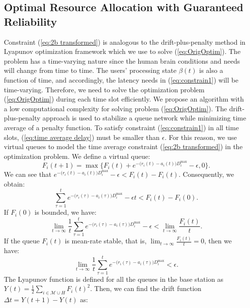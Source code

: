 \documentclass[journal,draftclsnofoot,onecolumn,12pt]{IEEEtran}%
\begin{document}
	\subsection{Optimal Resource Allocation with Guaranteed Reliability}
Constraint (\ref{eq:2b transformed}) is analogous to the drift-plus-penalty method in  Lyapunov optimization framework \cite{neely2010stochastic} which we use to solve (\ref{eq:OrigOptim}). The problem has a time-varying nature since the human brain conditions and needs will change from time to time. The users' processing state $\beta(t)$ is also a function of time, and accordingly, the latency needs in (\ref{eq:constrain1}) will be time-varying. Therefore, we need to solve the optimization problem (\ref{eq:OrigOptim}) during each time slot efficiently. We propose an algorithm with a  low  computational complexity for solving problem (\ref{eq:OrigOptim}).
The drift-plus-penalty approach is used to stabilize a queue network while minimizing time average of a penalty function. To satisfy constraint (\ref{eq:constrain1}) in all time slots, (\ref{eq:time average delay}) must be smaller than $\epsilon$. {For this reason, we use virtual queues to model the time average constraint (\ref{eq:2b transformed}) in the optimization problem.} We define a virtual queue:
\begin{equation}\label{eq:F_iEq}
F_i(t+1)=\max\{F_i(t)+e^{-\big(r_i(t)-a_i(t)\big)D_i^{\max}}-\epsilon,0\}.
\end{equation}
 We can see that $e^{-\big(r_i(t)-a_i(t)\big)D_i^{\max}}-\epsilon<F_i(t)-F_i(t)$.
Consequently, we obtain:
{
\begin{equation}
\sum_{\tau=1}^{t}e^{-\big(r_i(\tau)-a_i(\tau)\big)D_i^{\max}}-\epsilon t<F_i(t)-F_i(0).
\end{equation}}
If $F_i(0)$ is bounded, we have:
{\begin{equation}
\lim_{t\to \infty} \frac{1}{t}\sum_{\tau=1}^{t}e^{-\big(r_i(\tau)-a_i(\tau)\big)D_i^{\max}}-\epsilon<\lim_{t\to \infty}\frac{F_i(t)}{t}.
\end{equation}}
If the queue $F_i(t)$ is mean-rate stable, that is, $\lim_{t\to \infty}\frac{F_i(t)}{t}=0$, then we have:
{\begin{equation}
\lim_{t\to \infty} \frac{1}{t}\sum_{\tau=1}^{t}e^{-\big(r_i(\tau)-a_i(\tau)\big)D_i^{\max}}<\epsilon.
\end{equation}}
The Lyapunov function is defined for all the queues in the base station as 
$
Y(t)=\frac{1}{2}\sum_{i\in \mathcal{M} \cup H} F_i(t)^2.
$
Then, we can find the drift function $\Delta t=Y(t+1)-Y(t)$ as: 
\end{document}
